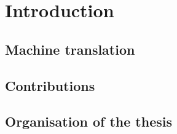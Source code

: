 \chapter{Introduction}

\section{Machine translation}


\section{Contributions}


\section{Organisation of the thesis}

